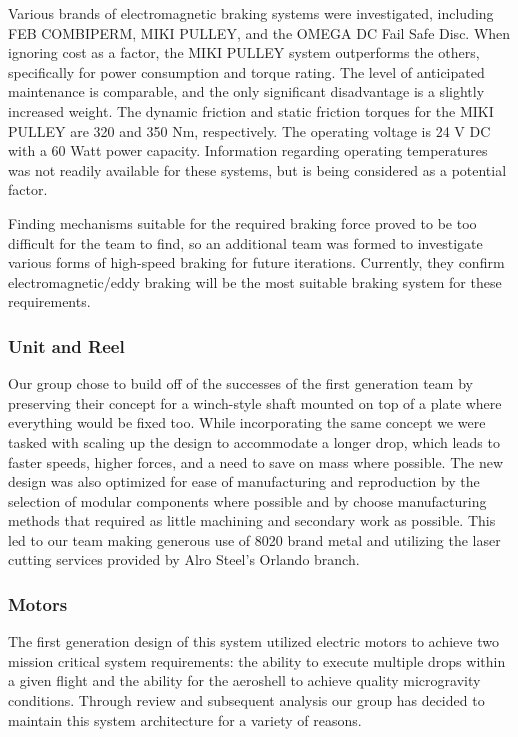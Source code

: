 \indent\indent Various brands of electromagnetic braking systems were investigated, including FEB COMBIPERM, MIKI PULLEY, and the OMEGA DC Fail Safe Disc. When ignoring cost as a factor, the MIKI PULLEY system outperforms the others, specifically for power consumption and torque rating. The level of anticipated maintenance is comparable, and the only significant disadvantage is a slightly increased weight. The dynamic friction and static friction torques for the MIKI PULLEY are 320 and 350 Nm, respectively. The operating voltage is 24 V DC with a 60 Watt power capacity. Information regarding operating temperatures was not readily available for these systems, but is being considered as a potential factor.

Finding mechanisms suitable for the required braking force proved to be too difficult for the team to find, so an additional team was formed to investigate various forms of high-speed braking for future iterations. Currently, they confirm electromagnetic/eddy braking will be the most suitable braking system for these requirements.

\subsubsection{Unit and Reel}

\indent\indent Our group chose to build off of the successes of the first generation team by preserving their concept for a winch-style shaft mounted on top of a plate where everything would be fixed too. While incorporating the same concept we were tasked with scaling up the design to accommodate a longer drop, which leads to faster speeds, higher forces, and a need to save on mass where possible. The new design was also optimized for ease of manufacturing and reproduction by the selection of modular components where possible and by choose manufacturing methods that required as little machining and secondary work as possible. This led to our team making generous use of 8020 brand metal and utilizing the laser cutting services provided by Alro Steel's Orlando branch. 

\subsubsection{Motors}

\indent\indent The first generation design of this system utilized electric motors to achieve two mission critical system requirements: the ability to execute multiple drops within a given flight and the ability for the aeroshell to achieve quality microgravity conditions. Through review and subsequent analysis our group has decided to maintain this system architecture for a variety of reasons. 

